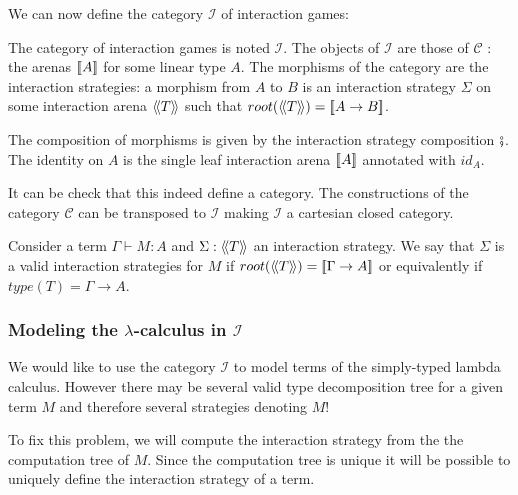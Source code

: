 We can now define the category $\mathcal{I}$ of interaction games:
\begin{dfn}
The category of interaction games is noted $\mathcal{I}$. The
objects of $\mathcal{I}$ are those of $\mathcal{C}$ : the arenas ${[\![ A ]\!]}$ for some linear type $A$. The morphisms of
the category are the interaction strategies: a morphism from $A$
to $B$ is an interaction strategy $\Sigma$ on some interaction arena
${\langle\!\langle T \rangle\!\rangle}$ such that $root({\langle\!\langle T \rangle\!\rangle}) = {[\![ A\rightarrow B ]\!]}$.

The composition of morphisms is given by the interaction strategy composition $\fatsemi$.
The identity on $A$ is the single leaf interaction arena ${[\![ A ]\!]}$ annotated with $id_A$.
\end{dfn}

It can be check that this indeed define a category. The constructions of the category $\mathcal{C}$ can be transposed to $\mathcal{I}$
making $\mathcal{I}$ a cartesian closed category.


\begin{dfn}
Consider a term $\Gamma \vdash M : A$ and $\Sigma : {\langle\!\langle T \rangle\!\rangle}$ an interaction strategy.
We say that $\Sigma$ is a valid interaction strategies for $M$ if $root({\langle\!\langle T \rangle\!\rangle}) = {[\![ \Gamma \rightarrow A ]\!]}$
or equivalently if $type(T) = \Gamma \rightarrow A$.
\end{dfn}


\subsubsection{Modeling the $\lambda$-calculus in $\mathcal{I}$}

We would like to use the category $\mathcal{I}$ to model terms of the
simply-typed lambda calculus. However there may be several valid type decomposition tree for a given term $M$ and therefore
several strategies denoting $M$!

To fix this problem, we will compute the interaction strategy from the
the computation tree of $M$. Since the computation tree is unique it will be possible to uniquely define
the interaction strategy of a term.


